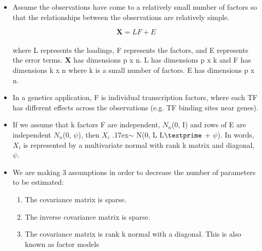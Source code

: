 \documentclass[12pt]{report}
\begin{document}
\begin{itemize}

\item Assume the observations have come to a relatively small number of factors so that the relationships between the observations are relatively simple.

\begin{equation}
\mathbf{X} = LF + E
\end{equation}
\\

where L represents the loadings, F represents the factors, and E represents the error terms. \textbf{X} has dimensions p x n. L has dimensions p x k and F has dimensions k x n where k is a small number of factors. E has dimensions p x n. 

\item In a genetics application, F is individual transcription factors, where each TF has different effects across the observations (e.g. TF binding sites near genes). 

\item If we assume that k factors F are independent, $N_{n}$(0, I) and rows of E are independent  $N_{n}$(0, $\psi$), then $X_{i}$ {\raise.17ex\hbox{$\scriptstyle\sim$}} N(0, L L$\textprime$ + $\psi$). In words, $X_{i}$ is represented by a multivariate normal with rank k matrix and diagonal, $\psi$.

\item We are making 3 assumptions in order to decrease the number of parameters to be estimated:

\begin{enumerate}

\item The covariance matrix is sparse.
\item The inverse covariance matrix is sparse. 
\item The covariance matrix is rank k normal with a diagonal. This is also known as factor models

\end{enumerate}

\end{itemize}
\end{document}
